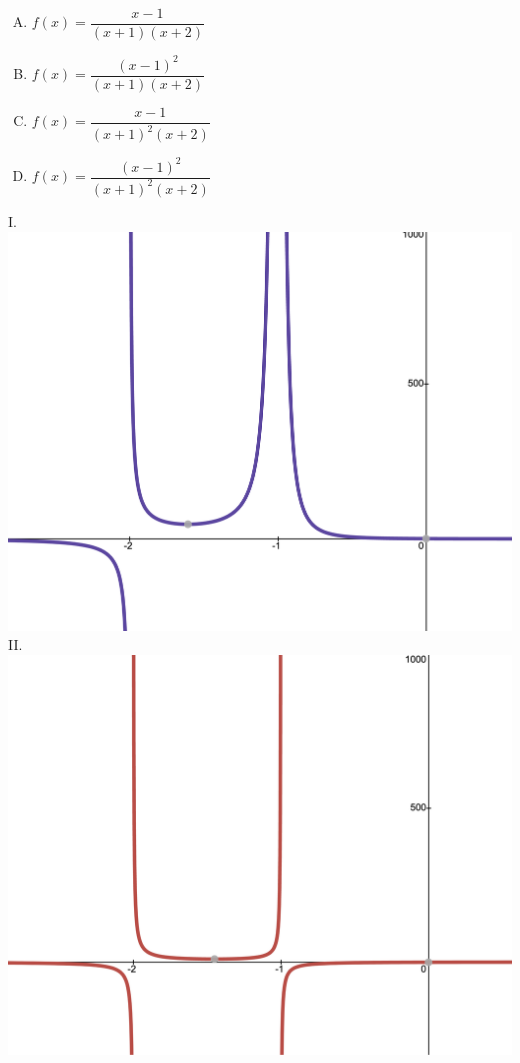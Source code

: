 \begin{frame}\AnswerNo{}
\begin{multicols}{2}\centering
\begin{enumerate}[A.]
\item $f(x)=\dfrac{x-1}{(x+1)(x+2)}$
\item $f(x)=\dfrac{(x-1)^2}{(x+1)(x+2)}$
\item $f(x)=\dfrac{x-1}{(x+1)^2(x+2)}$
\item $f(x)=\dfrac{(x-1)^2}{(x+1)^2(x+2)}$
\end{enumerate}
\end{multicols}

\begin{multicols}{2}\centering
\textcolor{C1}{I. }\includegraphics[height=\h\textheight]{fig/R4}\\[2em]

\textcolor{W1}{II. }\includegraphics[height=\h\textheight]{fig/R1}\\[2em]


\end{multicols}
\end{frame}

